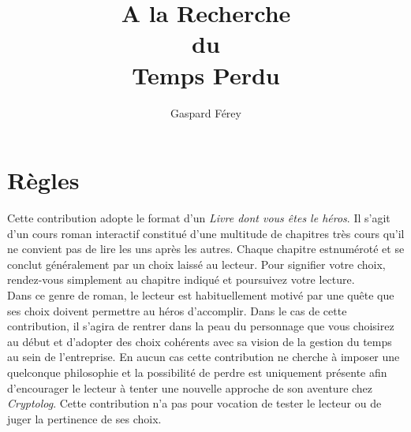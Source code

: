 \documentclass[12pt,a4paper,titlepage]{article}
\author{Gaspard Férey}
\title{A la Recherche \\ du \\ Temps Perdu}
\newcommand{\Cryptolog}{\emph{Cryptolog}}
\begin{document}
\maketitle

\section*{Règles}

Cette contribution adopte le format d'un \emph{Livre dont vous êtes le héros}. Il s'agit d'un cours roman interactif constitué d'une multitude de chapitres très cours qu'il ne convient pas de lire les uns après les autres. Chaque chapitre estnuméroté et se conclut généralement par un choix laissé au lecteur. Pour signifier votre choix, rendez-vous simplement au chapitre indiqué et poursuivez votre lecture.\\

Dans ce genre de roman, le lecteur est habituellement motivé par une quête que ses choix doivent permettre au héros d'accomplir. Dans le cas de cette contribution, il s'agira de rentrer dans la peau du personnage que vous choisirez au début et d'adopter des choix cohérents avec sa vision de la gestion du temps au sein de l'entreprise.
En aucun cas cette contribution ne cherche à imposer une quelconque philosophie et la possibilité de perdre est uniquement présente afin d'encourager le lecteur à tenter une nouvelle approche de son aventure chez \Cryptolog. Cette contribution n'a pas pour vocation de tester le lecteur ou de juger la pertinence de ses choix.\\
\end{document}
